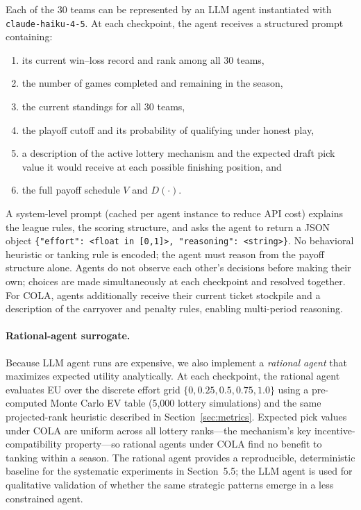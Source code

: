 Each of the 30 teams can be represented by an LLM agent instantiated with
\texttt{claude-haiku-4-5}.
At each checkpoint, the agent receives a structured prompt containing:
\begin{enumerate}
  \item its current win--loss record and rank among all 30 teams,
  \item the number of games completed and remaining in the season,
  \item the current standings for all 30 teams,
  \item the playoff cutoff and its probability of qualifying under honest play,
  \item a description of the active lottery mechanism and the expected draft
        pick value it would receive at each possible finishing position, and
  \item the full payoff schedule $V$ and $D(\cdot)$.
\end{enumerate}
A system-level prompt (cached per agent instance to reduce API cost)
explains the league rules, the scoring structure, and asks the agent to
return a JSON object \verb|{"effort": <float in [0,1]>, "reasoning": <string>}|.
No behavioral heuristic or tanking rule is encoded; the agent must reason from
the payoff structure alone.
Agents do not observe each other's decisions before making their own; choices
are made simultaneously at each checkpoint and resolved together.
For COLA, agents additionally receive their current ticket stockpile and a
description of the carryover and penalty rules, enabling multi-period reasoning.

\paragraph{Rational-agent surrogate.}
Because LLM agent runs are expensive, we also implement a \emph{rational agent}
that maximizes expected utility analytically.
At each checkpoint, the rational agent evaluates EU over the discrete effort
grid $\{0, 0.25, 0.5, 0.75, 1.0\}$ using a pre-computed Monte Carlo EV table
(5{,}000 lottery simulations) and the same projected-rank heuristic described
in Section~\ref{sec:metrics}.
Expected pick values under COLA are uniform across all lottery ranks---the
mechanism's key incentive-compatibility property---so rational agents under
COLA find no benefit to tanking within a season.
The rational agent provides a reproducible, deterministic baseline for the
systematic experiments in Section~5.5; the LLM agent is used for qualitative
validation of whether the same strategic patterns emerge in a less constrained
agent.

